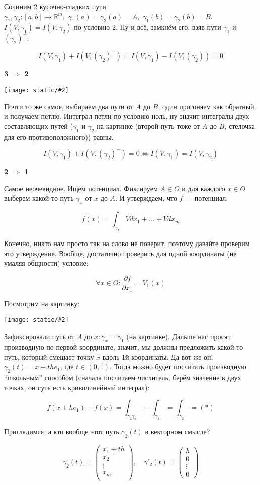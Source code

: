 \documentclass{article}
\def\dbl{\,\,}
\def\images#1#2{\begin{center}\texttt{[image: static/\#2]}\end{center}}
\begin{document}
Сочиним 2 кусочно-гладких пути $\gamma_1, \gamma_2: [a, b] \rightarrow \mathbb{R}^m, \dbl \gamma_1(a) = \gamma_2(a) = A, \dbl \gamma_1(b) = \gamma_2(b) = B$. $I(V, \gamma_1) = I(V, \gamma_2)$ по условию $2$. Ну и всё, замкнём его, взяв пути $\gamma_1$ и $(\gamma_2)^-$:

\[I(V, \gamma_1) + I(V, (\gamma_2)^-) = I(V, \gamma_1) - I(V, (\gamma_2)) = 0\]

\textbf{3 $\Rightarrow$ 2}

\images{0.3}{harakt_pot_vp_1.jpg}

Почти то же самое, выбираем два пути от $A$ до $B$, один прогоняем как обратный, и получаем петлю. Интеграл петли по условию ноль, ну значит интегралы двух составляющих путей ($\gamma_1$ и $\gamma_2$ на картинке (второй путь тоже от $A$ до $B$, стелочка для его противоположного)) равны.

\[I(V, \gamma_1) + I(V, (\gamma_2)^-) = 0 \Leftrightarrow I(V, \gamma_1) = I(V, \gamma_2)\]

\textbf{2 $\Rightarrow$ 1}

Самое неочевидное. Ищем потенциал. Фиксируем $A \in O$ и для каждого $x \in O$ выберем какой-то путь $\gamma_x$ от $x$ до $A$. И утверждаем, что $f$ --- потенциал:

\[f(x) = \int_{\gamma_x} Vdx_1 + \ldots + Vdx_m\]

Конечно, никто нам просто так на слово не поверит, поэтому давайте проверим это утверждение. Вообще, достаточно проверить для одной координаты (не умаляя общности) условие:

\[\forall x \in O : \frac{\partial f}{\partial x_1} = V_1(x)\]

Посмотрим на картинку:

\images{0.5}{harakt_pot_vp_2.jpg}

Зафиксировали путь от $A$ до $x: \gamma_x = \gamma_1$ (на картинке). Дальше нас просят производную по первой координате, значит, мы должны предложить какой-то путь, который смещает точку $x$ вдоль 1й координаты. Да вот же он! $\gamma_2(t) = x + the_1$, где $t \in (0, 1)$. Тогда можно будет посчитать производную ``школьным'' способом (сначала посчитаем числитель, берём значение в двух точках, он суть есть криволинейный интеграл):

\[f(x + he_1) - f(x) = \int_{\gamma_2\gamma_x} - \int_{\gamma_x} = \int_{\gamma_2} = (*)\]

Приглядимся, а кто вообще этот путь $\gamma_2(t)$ в векторном смысле?

\[\gamma_2(t) = \begin{pmatrix}
    x_1 + th\\
    x_2\\
    \vdots \\
    x_m\\
\end{pmatrix}, \quad \gamma'_2(t) = \begin{pmatrix}
    h\\
    0\\
    \vdots\\
    0
\end{pmatrix}\]
\end{document}
